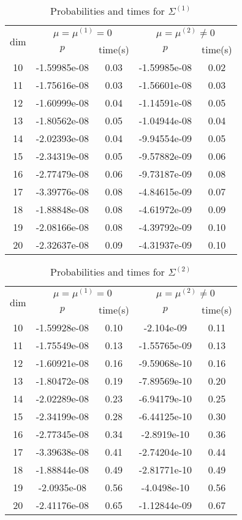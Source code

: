 \begin{table}[htbp]
\begin{center}
\begin{tabular}{c|cccc}
\hline
\multirow{2}{*}{dim}&
\multicolumn{2}{c}{$\mu=\mu^{(1)}=0$}&
\multicolumn{2}{c}{$\mu=\mu^{(2)}\neq 0$}\\
& $p$ & time(s) & $p$ & time(s)  \\
\hline
10 & -1.59985e-08 & 0.03 & -1.59985e-08 & 0.02 \\ 
11 & -1.75616e-08 & 0.03 & -1.56601e-08 & 0.03 \\ 
12 & -1.60999e-08 & 0.04 & -1.14591e-08 & 0.05 \\ 
13 & -1.80562e-08 & 0.05 & -1.04944e-08 & 0.04 \\ 
14 & -2.02393e-08 & 0.04 & -9.94554e-09 & 0.05 \\ 
15 & -2.34319e-08 & 0.05 & -9.57882e-09 & 0.06 \\ 
16 & -2.77479e-08 & 0.06 & -9.73187e-09 & 0.08 \\ 
17 & -3.39776e-08 & 0.08 & -4.84615e-09 & 0.07 \\ 
18 & -1.88848e-08 & 0.08 & -4.61972e-09 & 0.09 \\ 
19 & -2.08166e-08 & 0.08 & -4.39792e-09 & 0.10 \\ 
20 & -2.32637e-08 & 0.09 & -4.31937e-09 & 0.10 \\ 
\hline
\end{tabular}
\end{center}
\caption{Probabilities  and times for $\Sigma^{(1)}$}
\label{tab:hirotsu-1}
\end{table}

\begin{table}[htbp]
\begin{center}
\begin{tabular}{c|cccc}
\hline
\multirow{2}{*}{dim}&
\multicolumn{2}{c}{$\mu=\mu^{(1)}=0$}&
\multicolumn{2}{c}{$\mu=\mu^{(2)}\neq 0$}\\
& $p$ & time(s) & $p$ & time(s)  \\
\hline
10 & -1.59928e-08 & 0.10 & -2.104e-09 & 0.11 \\ 
11 & -1.75549e-08 & 0.13 & -1.55765e-09 & 0.13 \\ 
12 & -1.60921e-08 & 0.16 & -9.59068e-10 & 0.16 \\ 
13 & -1.80472e-08 & 0.19 & -7.89569e-10 & 0.20 \\ 
14 & -2.02289e-08 & 0.23 & -6.94179e-10 & 0.25 \\ 
15 & -2.34199e-08 & 0.28 & -6.44125e-10 & 0.30 \\ 
16 & -2.77345e-08 & 0.34 & -2.8919e-10 & 0.36 \\ 
17 & -3.39638e-08 & 0.41 & -2.74204e-10 & 0.44 \\ 
18 & -1.88844e-08 & 0.49 & -2.81771e-10 & 0.49 \\ 
19 & -2.0935e-08 & 0.56 & -4.0498e-10 & 0.56 \\ 
20 & -2.41176e-08 & 0.65 & -1.12844e-09 & 0.67 \\ 
\hline
\end{tabular}
\end{center}
\caption{Probabilities  and times for $\Sigma^{(2)}$}
\label{tab:hirotsu-2}
\end{table}
